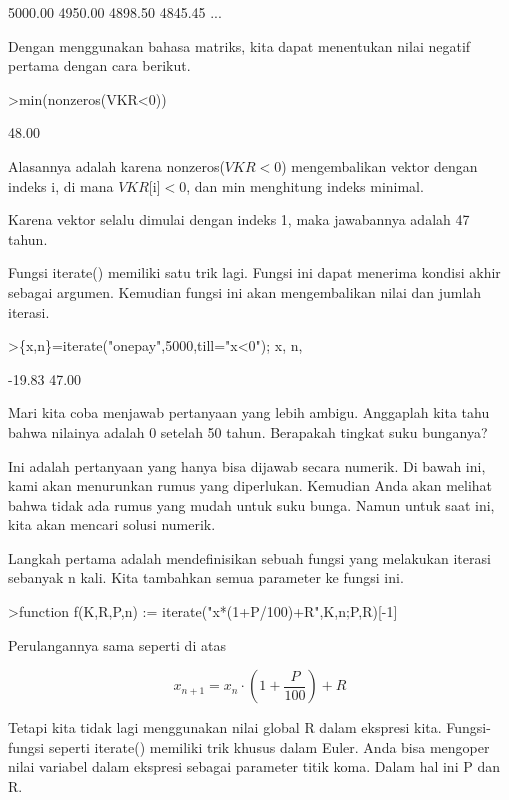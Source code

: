 \documentclass[a4paper,10pt]{article}
\begin{document}
\begin{eulernotebook}
\begin{euleroutput}
      5000.00     4950.00     4898.50     4845.45     ...
\end{euleroutput}
\begin{eulercomment}
Dengan menggunakan bahasa matriks, kita dapat menentukan nilai negatif
pertama dengan cara berikut.
\end{eulercomment}
\begin{eulerprompt}
>min(nonzeros(VKR<0))
\end{eulerprompt}
\begin{euleroutput}
        48.00 
\end{euleroutput}
\begin{eulercomment}
Alasannya adalah karena nonzeros($VKR<0$) mengembalikan vektor dengan
indeks i, di mana $VKR$[i]$<0$, dan min menghitung indeks minimal.

Karena vektor selalu dimulai dengan indeks 1, maka jawabannya adalah
47 tahun.

Fungsi iterate() memiliki satu trik lagi. Fungsi ini dapat menerima
kondisi akhir sebagai argumen. Kemudian fungsi ini akan mengembalikan
nilai dan jumlah iterasi.
\end{eulercomment}
\begin{eulerprompt}
>\{x,n\}=iterate("onepay",5000,till="x<0"); x, n,
\end{eulerprompt}
\begin{euleroutput}
       -19.83 
        47.00 
\end{euleroutput}
\begin{eulercomment}
Mari kita coba menjawab pertanyaan yang lebih ambigu. Anggaplah kita
tahu bahwa nilainya adalah 0 setelah 50 tahun. Berapakah tingkat suku
bunganya?

Ini adalah pertanyaan yang hanya bisa dijawab secara numerik. Di bawah
ini, kami akan menurunkan rumus yang diperlukan. Kemudian Anda akan
melihat bahwa tidak ada rumus yang mudah untuk suku bunga. Namun untuk
saat ini, kita akan mencari solusi numerik.

Langkah pertama adalah mendefinisikan sebuah fungsi yang melakukan
iterasi sebanyak n kali. Kita tambahkan semua parameter ke fungsi ini.
\end{eulercomment}
\begin{eulerprompt}
>function f(K,R,P,n) := iterate("x*(1+P/100)+R",K,n;P,R)[-1]
\end{eulerprompt}
\begin{eulercomment}
Perulangannya sama seperti di atas

\end{eulercomment}
\begin{eulerformula}
\[
x_{n+1}=x_n\cdot\left(1+\frac{P}{100}\right) + R
\]
\end{eulerformula}
\begin{eulercomment}
Tetapi kita tidak lagi menggunakan nilai global R dalam ekspresi kita.
Fungsi-fungsi seperti iterate() memiliki trik khusus dalam Euler. Anda
bisa mengoper nilai variabel dalam ekspresi sebagai parameter titik
koma. Dalam hal ini P dan R.


\end{eulercomment}
\end{eulernotebook}
\end{document}
